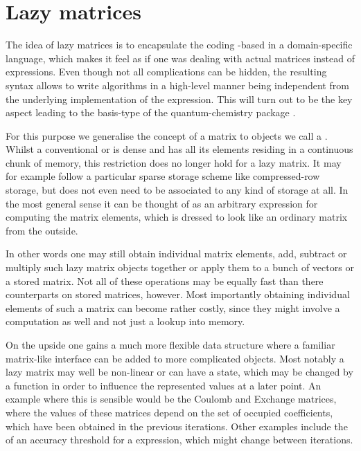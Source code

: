 \section{Lazy matrices}
\label{sec:lazymat}
The idea of lazy matrices is to encapsulate the coding \contraction-based
in a domain-specific language,
which makes it feel as if one was dealing with actual matrices
instead of \contraction expressions.
Even though not all complications can be hidden,
the resulting syntax allows to write algorithms in a high-level manner
being independent from the underlying implementation of the \contraction expression.
This will turn out to be the key aspect
leading to the basis-type of the quantum-chemistry package \molsturm.

For this purpose we generalise the concept of a matrix
to objects we call a .
Whilst a conventional or  is dense
and has all its elements residing in a continuous chunk of memory,
this restriction does no longer hold for a lazy matrix.
It may for example follow a particular sparse storage scheme
like compressed-row storage,
but does not even need to be associated to any kind of storage at all.
In the most general sense it can be thought of as an
arbitrary \contraction expression for computing the matrix elements,
which is dressed to look like an ordinary matrix from the outside.

In other words one may still obtain individual matrix elements,
add, subtract or multiply such lazy matrix objects together
or apply them to a bunch of vectors or a stored matrix.
Not all of these operations may be equally fast
than there counterparts on stored matrices, however.
Most importantly obtaining individual elements of such a matrix
can become rather costly,
since they might involve a computation as well
and not just a lookup into memory.

On the upside one gains a much more flexible data structure
where a familiar matrix-like interface
can be added to more complicated objects.
Most notably a lazy matrix may well be non-linear or can have a state,
which may be changed by a \update function
in order to influence the represented values at a later point.
An example where this is sensible would be the Coulomb and Exchange matrices,
where the values of these matrices depend on the set of occupied coefficients,
which have been obtained in the previous iterations.
Other examples include the \update of an accuracy threshold for a \contraction expression,
which might change between iterations.

